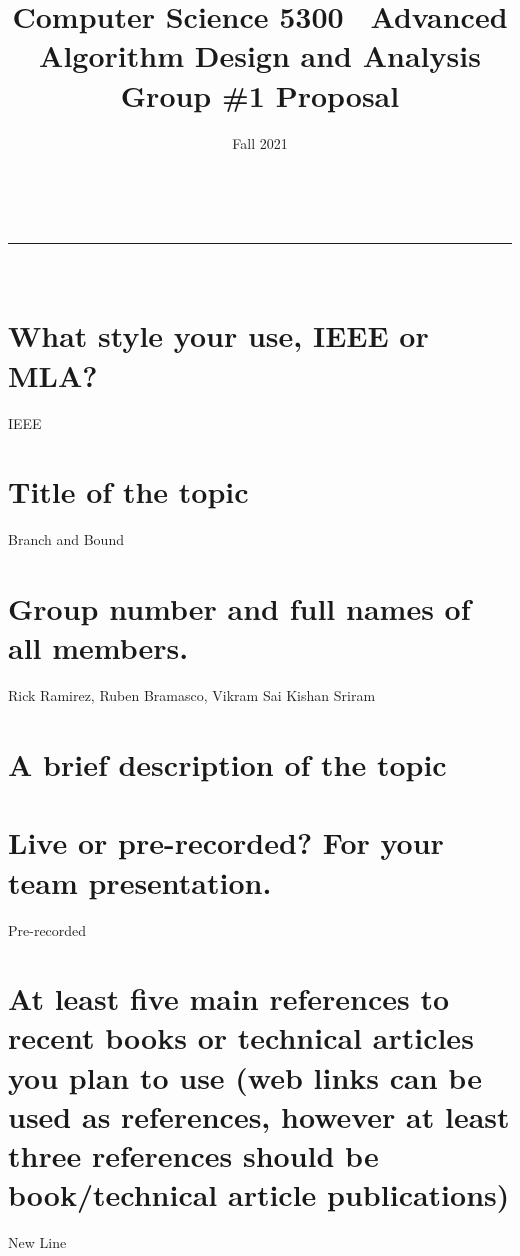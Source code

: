 \documentclass[11pt]{article}
\title{Computer Science 5300
\partition\
    Advanced Algorithm Design and Analysis\\
    \vspace{1ex}
    Group \#1 Proposal}
\author{\small }
\date{Fall 2021}
\makeatletter
\newcommand{\partition}{\rule{\linewidth}{0.8pt}}
\renewcommand{\maketitle}{
    \begin{center}
        \@date \hfill  \@author\\
        {\Large \textsc{\@title}}
        \partition\\
    \end{center}
}
\makeatother
\begin{document}
    \maketitle
    \section{What style your use, IEEE or MLA?}
        IEEE
    \section{Title of the topic}
        Branch and Bound
    \section{Group number and full names of all members.}
        Rick Ramirez, Ruben Bramasco, Vikram Sai Kishan Sriram
    \section{A brief description of the topic}
    \section{Live or pre-recorded? For your team presentation.}
        Pre-recorded
    \section{At least five main references to recent books or technical articles you plan to use
        (web links can be used as references, however at least three references should be book/technical article publications)}

    New Line\cite{Dirac195388}
    
    
\end{document}
